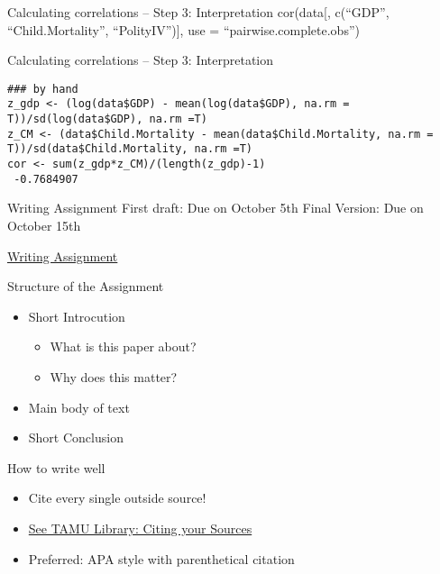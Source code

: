 \documentclass[presentation]{beamer}
\begin{document}
\begin{frame}[label={sec:org0186cf4}]{Calculating correlations -- Step 3: Interpretation}
cor(data[, c(``GDP'', ``Child.Mortality'', ``PolityIV'')], use = ``pairwise.complete.obs'')
\end{frame}

\begin{frame}[fragile,shrink=45,label={sec:orgd58d4f3}]{Calculating correlations -- Step 3: Interpretation}
 \begin{verbatim}
### by hand
z_gdp <- (log(data$GDP) - mean(log(data$GDP), na.rm = T))/sd(log(data$GDP), na.rm =T)
z_CM <- (data$Child.Mortality - mean(data$Child.Mortality, na.rm = T))/sd(data$Child.Mortality, na.rm =T)
cor <- sum(z_gdp*z_CM)/(length(z_gdp)-1)
 -0.7684907
\end{verbatim}
\end{frame}



\begin{frame}[label={sec:org07b1944}]{Writing Assignment}
First draft: Due on October 5th
Final Version: Due on October 15th

\href{http://fhollenbach.org/Polisci209\_2018/slides/week5/WritingAssignment1.pdf}{Writing Assignment}
\end{frame}


\begin{frame}[label={sec:org1e36cfb}]{Structure of the Assignment}
\begin{itemize}
\item Short Introcution
\begin{itemize}
\item What is this paper about?
\item Why does this matter?
\end{itemize}
\item Main body of text
\item Short Conclusion
\end{itemize}
\end{frame}

\begin{frame}[label={sec:org8115e09}]{How to write well}
\begin{itemize}
\item Cite every single outside source!
\item \href{https://library.tamu.edu/services/library\_tutorials/citing\_sources/index.html}{See TAMU Library: Citing your Sources}
\item Preferred: APA style with parenthetical citation
\end{itemize}
\end{frame}
\end{document}
